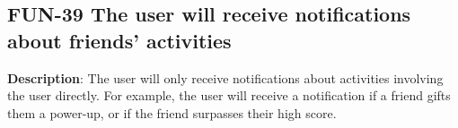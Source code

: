 \subsection{FUN-39 The user will receive notifications about friends\textquoteright{}
activities}
\textbf{Description}: The user will only receive notifications about
activities involving the user directly. For example, the user will
receive a notification if a friend gifts them a power-up, or if the
friend surpasses their high score.

